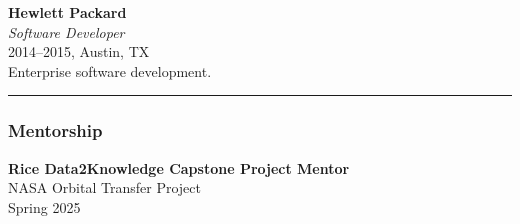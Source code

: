 \documentclass[
  letterpaper,
  DIV=11,
  numbers=noendperiod]{scrartcl}
\begin{document}
\textbf{Hewlett Packard}\\
\emph{Software Developer}\\
2014--2015, Austin, TX\\
Enterprise software development.

\begin{center}\rule{0.5\linewidth}{0.5pt}\end{center}

\subsubsection{Mentorship}\label{mentorship}

\textbf{Rice Data2Knowledge Capstone Project Mentor}\\
NASA Orbital Transfer Project\\
Spring 2025
\end{document}
